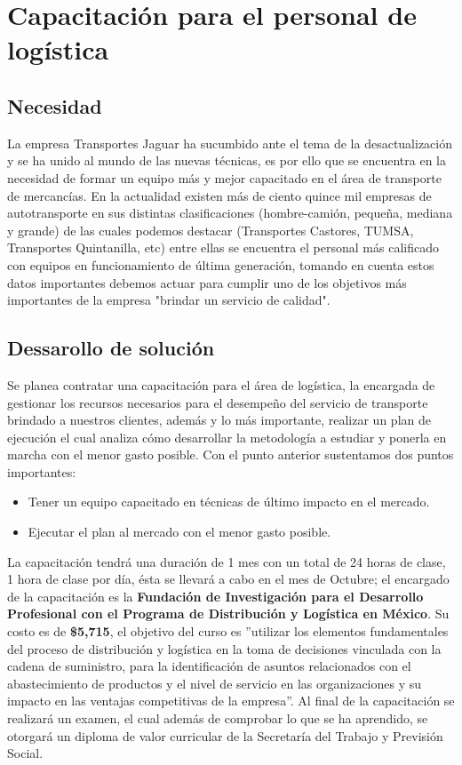 \section{Capacitación para el personal de logística}

	\subsection{Necesidad}
		La empresa Transportes Jaguar ha sucumbido ante el tema de la desactualización y se ha unido al mundo de las nuevas técnicas, es por ello que se encuentra en la necesidad de formar un equipo más y mejor capacitado en el área de transporte de mercancías. En la actualidad existen más de ciento quince mil empresas de autotransporte en sus distintas clasificaciones (hombre-camión, pequeña, mediana y grande) de las cuales podemos destacar (Transportes Castores, TUMSA, Transportes Quintanilla, etc) entre ellas se encuentra el personal más calificado con equipos en funcionamiento de última generación, tomando en cuenta estos datos importantes debemos actuar para cumplir uno de los objetivos más importantes de la empresa "brindar un servicio de calidad".
		
		\subsection{Dessarollo de solución}
		
Se planea contratar una capacitación para el área de logística, la encargada de gestionar los recursos necesarios para el desempeño del servicio de transporte brindado a nuestros clientes, además y lo más importante, realizar un plan de ejecución el cual analiza cómo desarrollar la metodología a estudiar  y ponerla en marcha con el menor gasto posible. Con el punto anterior sustentamos dos puntos importantes:
	\begin{itemize}
		\item Tener un equipo capacitado en técnicas de último impacto en el mercado.
		\item Ejecutar el plan al mercado con el menor gasto posible.
	\end{itemize}
	
La capacitación tendrá una duración de 1 mes con un total de 24 horas de clase, 1 hora de clase por día, ésta se llevará a cabo en el mes de Octubre; el encargado de la capacitación es la \textbf{Fundación de Investigación para el Desarrollo Profesional con el Programa de Distribución y Logística en México}. Su costo es de \textbf{\$5,715}, el objetivo del curso es ''utilizar los elementos fundamentales del proceso de distribución y logística en la toma de decisiones vinculada con la cadena de suministro, para la identificación de asuntos relacionados con el abastecimiento de productos y el nivel de servicio en las organizaciones y su impacto en las ventajas competitivas de la empresa''. Al final de la capacitación se realizará un examen, el cual además de comprobar lo que se ha aprendido, se otorgará un diploma de valor curricular de la Secretaría del Trabajo y Previsión Social.

